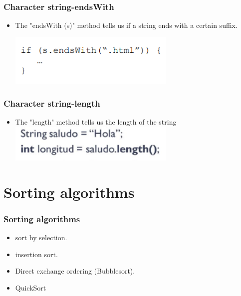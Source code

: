 \documentclass[11pt]{beamer}
\begin{document}
\begin{frame}
\frametitle{Character string-endsWith}
\begin{itemize}
\item The "endsWith (s)" method tells us if a string ends with a certain suffix.
\

{\includegraphics[width=8.0cm]{img/a7.png}}
\end{itemize}
\end{frame}

\begin{frame}
\frametitle{Character string-length}
\begin{itemize}
\item The "length" method tells us the length of the string
\
{\includegraphics[width=8.0cm]{img/a8.png}}
\end{itemize}
\end{frame}


\section{Sorting algorithms}
\begin{frame}
\frametitle{Sorting algorithms}
\begin{itemize}
\item sort by selection.
\item insertion sort.
\item Direct exchange ordering (Bubblesort).
\item QuickSort
\end{itemize}
\end{frame}
\end{document}
